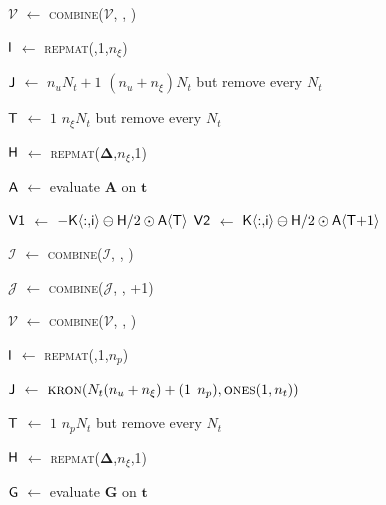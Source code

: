 \begin{vAlgorithm}[!ht]{1\columnwidth}{0em}
{$\mathcal{V}$ $\gets$ \textsc{combine}($\mathcal{V}$, , )


$\textup{\textsf{I}}$ $\gets$ \textsc{repmat}(,1,$n_\xi$) 

$\textup{\textsf{J}}$ $\gets$ $n_u N_t+1$ \KwTo $(n_u+n_\xi)N_t$ but remove every $N_t$ 

$\textup{\textsf{T}}$ $\gets$ $1$ \KwTo $n_\xi N_t$ but remove every $N_t$ 

$\textup{\textsf{H}}$ $\gets$ \textsc{repmat}($\bm{\Delta}$,$n_\xi$,1) 

$\textup{\textsf{A}}$ $\gets$ evaluate $\bm{A}$ on $\bm{t}$ %

$\textup{\textsf{V1}}$ $\gets$ $-\textup{\textsf{K$\langle${$:,$i}$\rangle$}} \ominus \textup{\textsf{H}}/2 \odot \textup{\textsf{A$\langle${T}$\rangle$}}$ \label{line:ch5:SSdefects_V1} 
$\textup{\textsf{V2}}$ $\gets$ $\textup{\textsf{K$\langle${$:,$i}$\rangle$}} \ominus \textup{\textsf{H}}/2 \odot \textup{\textsf{A$\langle${T$+1$}$\rangle$}}$ \label{line:ch5:SSdefects_V2} 

$\mathcal{I}$ $\gets$ \textsc{combine}($\mathcal{I}$, , )

$\mathcal{J}$ $\gets$ \textsc{combine}($\mathcal{J}$, , +1)

$\mathcal{V}$ $\gets$ \textsc{combine}($\mathcal{V}$, , )


$\textup{\textsf{I}}$ $\gets$ \textsc{repmat}(,1,$n_p$) 

$\textup{\textsf{J}}$ $\gets$ $\textsc{kron}(N_t (n_u+n_\xi)+(1$ \KwTo $n_p), \textsc{ones}(1,n_t))$ 

$\textup{\textsf{T}}$ $\gets$ $1$ \KwTo $n_p N_t$ but remove every $N_t$ 

$\textup{\textsf{H}}$ $\gets$ \textsc{repmat}($\bm{\Delta}$,$n_\xi$,1) 

$\textup{\textsf{G}}$ $\gets$ evaluate $\bm{G}$ on $\bm{t}$ %

}
\end{vAlgorithm}
